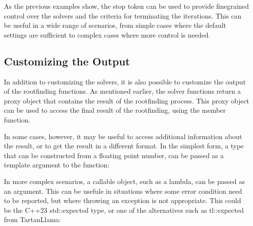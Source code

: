 \documentclass[letterpaper,10pt,english]{sphinxmanual}
\begin{document}
\sphinxAtStartPar
As the previous examples show, the stop token can be used to provide fine\sphinxhyphen{}grained control over the solvers and the criteria for terminating the iterations. This can be useful in a wide range of scenarios, from simple cases where the default settings are sufficient to complex cases where more control is needed.


\subsection{Customizing the Output}
\label{\detokenize{docRoots:customizing-the-output}}
\sphinxAtStartPar
In addition to customizing the solvers, it is also possible to customize the output of the root\sphinxhyphen{}finding functions. As mentioned earlier, the solver functions return a proxy object that contains the result of the root\sphinxhyphen{}finding process. This proxy object can be used to access the final result of the root\sphinxhyphen{}finding, using the  member function.

\sphinxAtStartPar
In some cases, however, it may be useful to access additional information about the result, or to get the result in a different format. In the simplest form, a type that can be constructed from a floating point number, can be passed as a template argument to the  function:

\begin{sphinxVerbatim}[commandchars=\\\{\}]
\PYG{p}{[}\PYG{p}{]}
\end{sphinxVerbatim}

\sphinxAtStartPar
In more complex scenarios, a callable object, such as a lambda, can be passed as an argument. This can be usefule in situations where some error condition need to be reported, but where throwing an exception is not appropriate. This could be the C++23 std::expected type, or one of the alternatives such as tl::expected from TartanLlama:
\end{document}
